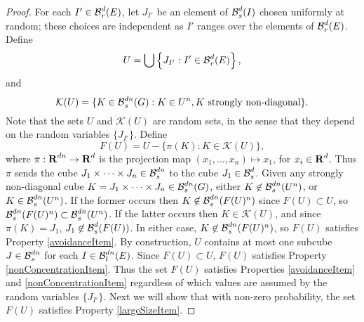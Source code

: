\begin{proof}
	For each $I' \in \operatorname{\mathcal{B}}_r^d(E)$, let $J_{I'}$ be an element of $\operatorname{\mathcal{B}}^d_s(I)$ chosen uniformly at random; these choices are independent as $I'$ ranges over the elements of $\operatorname{\mathcal{B}}_r^d(E)$. Define
	\[ 	U = \bigcup \left\{ J_{I'} : I' \in \operatorname{\mathcal{B}}_r^d(E) \right\}, \]
	and
	\[ \mathcal{K}(U) = \{ K \in \operatorname{\mathcal{B}}^{dn}_s(G) : K \in U^n, \text{$K$ strongly non-diagonal} \}. \]
	Note that the sets $U$ and $\mathcal{K}(U)$ are random sets, in the sense that they depend on the random variables $\{ J_{I'} \}$. Define
	\begin{equation} \label{defnOfF}
		F(U) = U - \{ \pi(K) : K \in \mathcal{K}(U) \},
	\end{equation}
	where $\pi: \operatorname{\mathbf{R}}^{dn} \to \operatorname{\mathbf{R}}^d$ is the projection map $(x_1, \dots, x_n) \mapsto x_1$, for $x_i \in \operatorname{\mathbf{R}}^d$. Thus $\pi$ sends the cube $J_1 \times \dots \times J_n\in \operatorname{\mathcal{B}}^{dn}_s$ to the cube $J_1 \in \operatorname{\mathcal{B}}^d_s$. Given any strongly non-diagonal cube $K = J_1 \times \cdots \times J_n \in \operatorname{\mathcal{B}}_s^{dn}(G)$, either $K \not \in \operatorname{\mathcal{B}}_s^{dn}(U^n)$, or $K \in \operatorname{\mathcal{B}}_s^{dn}(U^n)$. If the former occurs then $K \not \in \operatorname{\mathcal{B}}_s^{dn}(F(U)^n)$ since $F(U) \subset U$, so $\operatorname{\mathcal{B}}_s^{dn}(F(U)^n) \subset \operatorname{\mathcal{B}}_s^{dn}(U^n)$. If the latter occurs then $K \in \mathcal{K}(U)$, and since $\pi(K) = J_1$, $J_1 \not \in \operatorname{\mathcal{B}}_s^d(F(U))$. In either case, $K \not \in \operatorname{\mathcal{B}}_s^{dn}(F(U)^n)$, so $F(U)$ satisfies Property \ref{avoidanceItem}. By construction, $U$ contains at most one subcube $J \in \operatorname{\mathcal{B}}^{dn}_s$ for each $I \in \operatorname{\mathcal{B}}^{dn}_l(E)$. Since $F(U) \subset U$, $F(U)$ satisfies Property \ref{nonConcentrationItem}. Thus the set $F(U)$ satisfies Properties \ref{avoidanceItem} and \ref{nonConcentrationItem} regardless of which values are assumed by the random variables $\{ J_{I'} \}$. Next we will show that with non-zero probability, the set $F(U)$ satisfies Property \ref{largeSizeItem}. 


\end{proof}
